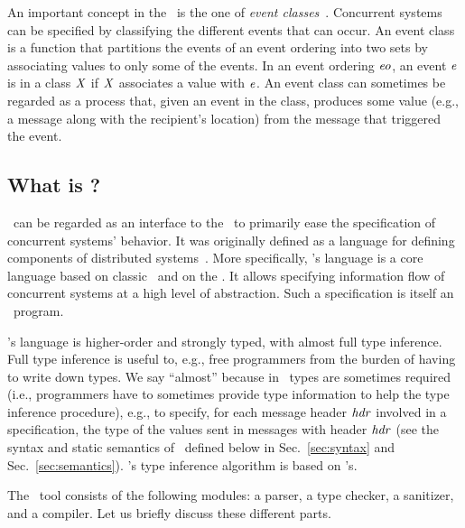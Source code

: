 \documentclass[final]{article}
\begin{document}
An important concept in the \logicE\ is the one of \emph{event
  classes}~\cite{Bickford:2009}.  Concurrent systems can be specified
by classifying the different events that can occur.  An event class is
a function that partitions the events of an event ordering into two
sets by associating values to only some of the events.  In an event
ordering $\mathit{eo}$, an event $\mathit{e}$ is in a class $\mathit{X}$
if $\mathit{X}$ associates a value with $\mathit{e}$.
%
An event class can sometimes be regarded as a process that, given an
event in the class, produces some value (e.g., a message along with
the recipient's location) from the message that triggered the event.



\subsection{What is \eml?}


\eml\ can be regarded as an interface to the \logicE\ to primarily
ease the specification of concurrent systems' behavior.  It was
originally defined as a language for defining components of
distributed systems~\cite{Bickford:2009}.  More specifically,
\eml's language is a core language based on classic \ML\ and on the
\logicE.  It allows specifying information flow of concurrent systems
at a high level of abstraction.  Such a specification is itself an
\eml\ program.

\eml's language is higher-order and strongly typed, with almost full
type inference.  Full type inference is useful to, e.g., free
programmers from the burden of having to write down types.  We say
``almost'' because in \eml\ types are sometimes required (i.e.,
programmers have to sometimes provide type information to help the
type inference procedure), e.g., to specify, for each message header
$\mathit{hdr}$ involved in a specification, the type of the values sent
in messages with header $\mathit{hdr}$ (see the syntax and static
semantics of \eml\ defined below in Sec.~\ref{sec:syntax} and
Sec.~\ref{sec:semantics}).  \eml's type inference algorithm is based
on \ML's.

The \eml\ tool consists of the following modules: a parser, a type
checker, a sanitizer, and a compiler.  Let us briefly discuss these
different parts.
\end{document}
